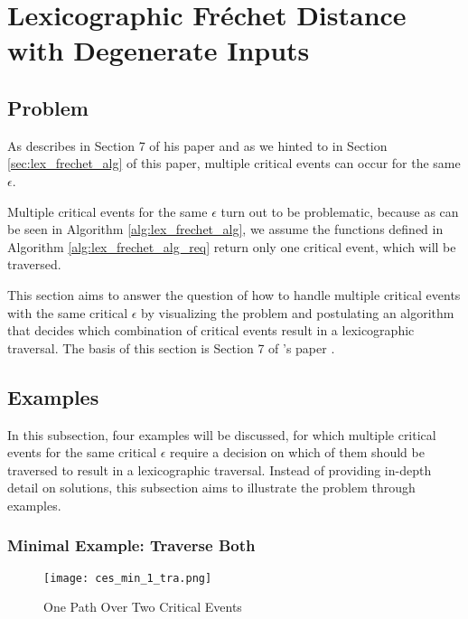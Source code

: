 
\section{Lexicographic Fréchet Distance with Degenerate Inputs}\label{lex_frechet_deg}

\subsection{Problem}

As \citeauthor{rotelex} describes in Section 7 of his paper  and as we hinted to in Section \ref{sec:lex_frechet_alg} of this paper, multiple critical events can occur for the same $\epsilon$.

Multiple critical events for the same $\epsilon$ turn out to be problematic, because as can be seen in Algorithm \ref{alg:lex_frechet_alg}, we assume the functions defined in Algorithm \ref{alg:lex_frechet_alg_req} return only one critical event, which will be traversed.

This section aims to answer the question of how to handle multiple critical events with the same critical $\epsilon$ by visualizing the problem and postulating an algorithm that decides which combination of critical events result in a lexicographic traversal. The basis of this section is Section 7 of \citeauthor{rotelex}'s paper \cite{rotelex}.


\subsection{Examples}

In this subsection, four examples will be discussed, for which multiple critical events for the same critical $\epsilon$ require a decision on which of them should be traversed to result in a lexicographic traversal. Instead of providing in-depth detail on solutions, this subsection aims to illustrate the problem through examples.


\subsubsection{Minimal Example: Traverse Both}

\begin{figure}[H]
    \centering
    
    \texttt{[image: ces\_min\_1\_tra.png]}
		
	\caption{One Path Over Two Critical Events\protect\footnotemark}
    \label{fig:ces_min_1}
\end{figure}

